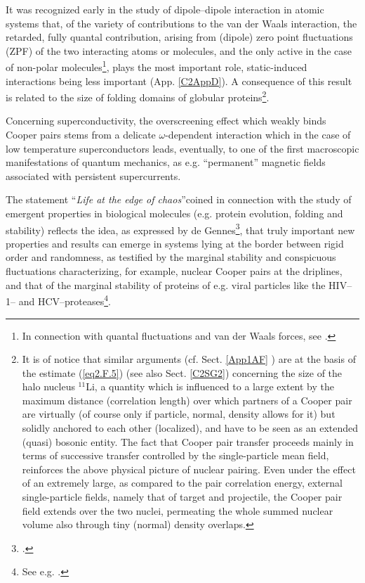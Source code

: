 It was recognized early in the study of dipole--dipole interaction in atomic systems that, of the variety of contributions to the van der Waals interaction, the retarded, fully quantal contribution, arising from (dipole) zero point fluctuations (ZPF) of the two interacting atoms or molecules, and the only active  in the case of non-polar molecules\footnote{In connection with quantal fluctuations and van der Waals forces, see \cite{London:37}.}, plays the most important role, static-induced interactions being less important (App. \ref{C2AppD}). A consequence of this result is related to the size of folding domains of globular proteins\footnote{It is of notice that similar arguments (cf. Sect. \ref{App1AF} ) are at the basis of the estimate (\ref{eq2.F.5}) (see also Sect. \ref{C2SG2}) concerning the size of the halo nucleus $^{11}$Li, a quantity which is influenced to a large extent by the maximum distance (correlation length) over which  partners of a Cooper pair are virtually (of course only if particle, normal, density allows for it) but solidly anchored to each other (localized), and have to be seen as an extended (quasi) bosonic entity. The fact that Cooper pair transfer proceeds mainly in terms of successive transfer controlled by the single-particle mean field, reinforces the above physical picture of nuclear pairing. Even under the effect of an extremely large, as compared to the pair correlation energy, external single-particle fields, namely that of target and projectile, the Cooper pair field extends over the two nuclei, permeating the whole summed nuclear volume also through  tiny (normal) density overlaps.}.  


Concerning superconductivity, the overscreening effect which  weakly binds Cooper pairs stems from a delicate $\omega$-dependent interaction which in the case of low temperature superconductors leads, eventually, to one of the first macroscopic manifestations of quantum mechanics, as e.g. ``permanent'' magnetic fields associated with persistent  supercurrents.

The statement ``\textit{Life at the edge of chaos}''coined in connection with the study of emergent properties in biological molecules (e.g. protein evolution, folding and stability) reflects the idea, as expressed by de Gennes\footnote{\cite{DeGennes:94}.}, that truly important new properties and results can emerge in systems lying at the border between rigid order and randomness, as testified by the marginal stability and conspicuous fluctuations characterizing, for example, nuclear Cooper pairs at the driplines, and that of the marginal stability of proteins of e.g.  viral particles like the HIV--1-- and HCV--proteases\footnote{See e.g. \cite{Broglia:13b}.}.


